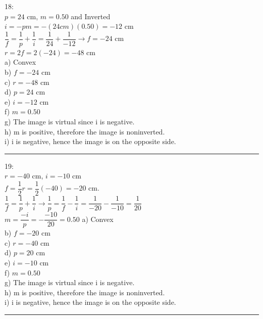 \documentclass[fleqn]{article}
\begin{document}
\begin{enumerate}
    \textcolor{hwColor}{
      18: \\
      $p=24$ cm, $m=0.50$ and Inverted\\
      $i=-pm=-(24 cm)(0.50)=-12$ cm \\
      $\dfrac{1}{f}=\dfrac{1}{p}+\dfrac{1}{i}=\dfrac{1}{24}+\dfrac{1}{-12} \rightarrow f=-24$ cm \\
      $r=2f=2(-24)=-48$ cm \\
      a) Convex \\
      b) $f=-24$ cm \\
      c) $r=-48$ cm \\
      d) $p=24$ cm \\
      e) $i=-12$ cm \\
      f) $m=0.50$ \\
      g) The image is virtual since i is negative. \\
      h) m is positive, therefore the image is noninverted. \\
      i) i is negative, hence the image is on the opposite side. \\
    }

    \textcolor{hwColor}{
      \rule{15cm}{0.4pt}
    }

    \textcolor{hwColor}{
      19: \\
      $r=-40$ cm, $i=-10$ cm\\
      $f=\dfrac{1}{2}r=\dfrac{1}{2}(-40)=-20$ cm. \\
      $\dfrac{1}{f}=\dfrac{1}{p}+\dfrac{1}{i} \rightarrow \dfrac{1}{p}=\dfrac{1}{f}-\dfrac{1}{i}=\dfrac{1}{-20}-\dfrac{1}{-10}=\dfrac{1}{20}$ \\
      $m=\dfrac{-i}{p}=-\dfrac{-10}{20}=0.50$
      a) Convex \\
      b) $f=-20$ cm \\
      c) $r=-40$ cm \\
      d) $p=20$ cm \\
      e) $i=-10$ cm \\
      f) $m=0.50$ \\
      g) The image is virtual since i is negative. \\
      h) m is positive, therefore the image is noninverted. \\
      i) i is negative, hence the image is on the opposite side. \\
    }

    \textcolor{hwColor}{
      \rule{15cm}{0.4pt}
    }


\end{enumerate}
\end{document}
